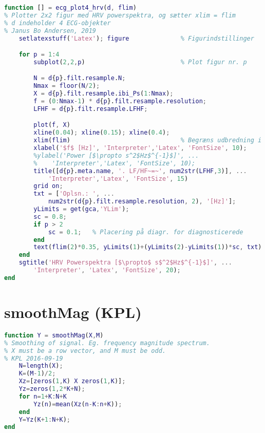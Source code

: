 \documentclass[a4paper]{report}
\begin{document}
        
\begin{lstlisting}[language=Matlab, style=Matlab-editor]
function [] = ecg_plot4_hrv(d, flim)
% Plotter 2x2 figur med HRV powerspektra, og sætter xlim = flim
% d indeholder 4 ECG-objekter
% Janus Bo Andersen, 2019
    setlatexstuff('Latex'); figure              % Figurindstillinger

    for p = 1:4
        subplot(2,2,p)                          % Plot figur nr. p

        N = d{p}.filt.resample.N;
        Nmax = floor(N/2);
        X = d{p}.filt.resample.ibi_Ps(1:Nmax);
        f = (0:Nmax-1) * d{p}.filt.resample.resolution;
        LFHF = d{p}.filt.resample.LFHF;

        plot(f, X)
        xline(0.04); xline(0.15); xline(0.4);
        xlim(flim)                              % Begræns udbredning i x
        xlabel('$f$ [Hz]', 'Interpreter','Latex', 'FontSize', 10);
        %ylabel('Power [$\propto s^2$Hz$^{-1}$]', ...
        %    'Interpreter','Latex', 'FontSize', 10);
        title([d{p}.meta.name, '. LF/HF~=~', num2str(LFHF,3)], ...
            'Interpreter','Latex', 'FontSize', 15)
        grid on;
        txt = ['Oplsn.: ', ...
            num2str(d{p}.filt.resample.resolution, 2), '[Hz]'];
        yLimits = get(gca,'YLim');
        sc = 0.8;
        if p > 2
            sc = 0.1;   % Placering på diagr. for diagnosticerede
        end
        text(flim(2)*0.35, yLimits(1)+(yLimits(2)-yLimits(1))*sc, txt)
    end
    sgtitle('HRV Powerspektra [$\propto$ s$^2$Hz$^{-1}$]', ...
        'Interpreter', 'Latex', 'FontSize', 20);
end
\end{lstlisting}



\section{smoothMag (KPL)}

        
\begin{lstlisting}[language=Matlab, style=Matlab-editor]
function Y = smoothMag(X,M)
% Smoothing of signal. Eg. frequency magnitude spectrum.
% X must be a row vector, and M must be odd.
% KPL 2016-09-19
    N=length(X);
    K=(M-1)/2;
    Xz=[zeros(1,K) X zeros(1,K)];
    Yz=zeros(1,2*K+N);
    for n=1+K:N+K
        Yz(n)=mean(Xz(n-K:n+K));
    end
    Y=Yz(K+1:N+K);
end
\end{lstlisting}


\newpage
\printbibliography
\end{document}
